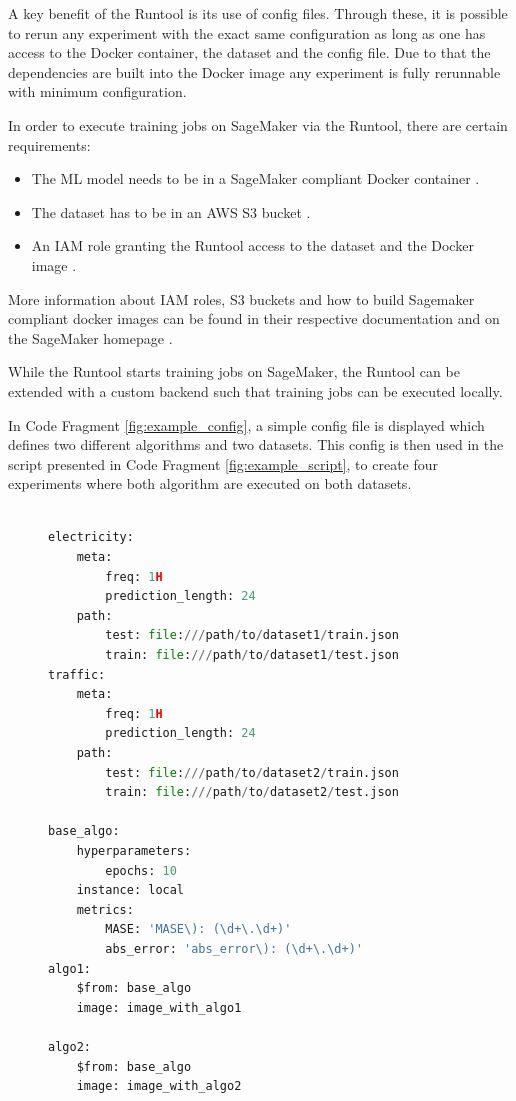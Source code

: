 A key benefit of the Runtool is its use of config files. Through these, it is possible to rerun any experiment with the exact same configuration as long as one has access to the Docker container, the dataset and the config file. Due to that the dependencies are built into the Docker image any experiment is fully rerunnable with minimum configuration.

In order to execute training jobs on SageMaker via the Runtool, there are certain requirements:
\begin{itemize}
  \item The ML model needs to be in a SageMaker compliant Docker container \cite{sagemaker_docker_documentation}.
  \item The dataset has to be in an AWS S3 bucket \cite{s3_website}.
  \item An IAM role granting the Runtool access to the dataset and the Docker image \cite{iam_website}.
\end{itemize}

More information about IAM roles, S3 buckets and how to build Sagemaker compliant docker images can be found in their respective documentation \cite{sagemaker_docker_documentation,s3_website,iam_website} and on the SageMaker homepage \cite{sagemaker_website}.

While the Runtool starts training jobs on SageMaker, the Runtool can be extended with a custom backend such that training jobs can be executed locally.

In Code Fragment \ref{fig:example_config}, a simple config file is displayed which defines two different algorithms and two datasets. This config is then used in the script presented in Code Fragment \ref{fig:example_script}, to create four experiments where both algorithm are executed on both datasets.

\begin{figure}
  \begin{lstlisting}[language=Python, label={fig:example_config}, caption={Config file describing two algorithms and two datasets. \$from inherits the values from another node.}]

electricity:
    meta:
        freq: 1H
        prediction_length: 24
    path:
        test: file:///path/to/dataset1/train.json
        train: file:///path/to/dataset1/test.json
traffic:
    meta:
        freq: 1H
        prediction_length: 24
    path:
        test: file:///path/to/dataset2/train.json
        train: file:///path/to/dataset2/test.json

base_algo:
    hyperparameters:
        epochs: 10
    instance: local
    metrics: 
        MASE: 'MASE\): (\d+\.\d+)'
        abs_error: 'abs_error\): (\d+\.\d+)'
algo1:
    $from: base_algo
    image: image_with_algo1

algo2:
    $from: base_algo
    image: image_with_algo2

\end{lstlisting}
\end{figure}
\clearpage


